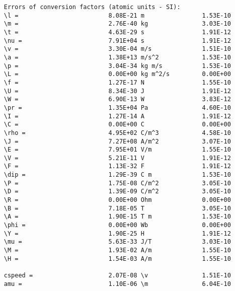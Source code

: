 \documentclass[12pt,a4paper]{article}
\begin{document}
\begin{verbatim}
     Errors of conversion factors (atomic units - SI):
     \l =                         8.08E-21 m                1.53E-10
     \m =                         2.76E-40 kg               3.03E-10
     \t =                         4.63E-29 s                1.91E-12
     \nu =                        7.91E+04 s                1.91E-12
     \v =                         3.30E-04 m/s              1.51E-10
     \a =                         1.38E+13 m/s^2            1.53E-10
     \p =                         3.04E-34 kg m/s           1.53E-10
     \L =                         0.00E+00 kg m^2/s         0.00E+00
     \f =                         1.27E-17 N                1.55E-10
     \U =                         8.34E-30 J                1.91E-12
     \W =                         6.90E-13 W                3.83E-12
     \pr =                        1.35E+04 Pa               4.60E-10
     \I =                         1.27E-14 A                1.91E-12
     \C =                         0.00E+00 C                0.00E+00
     \rho =                       4.95E+02 C/m^3            4.58E-10
     \J =                         7.27E+08 A/m^2            3.07E-10
     \E =                         7.95E+01 V/m              1.55E-10
     \V =                         5.21E-11 V                1.91E-12
     \F =                         1.13E-32 F                1.91E-12
     \dip =                       1.29E-39 C m              1.53E-10
     \P =                         1.75E-08 C/m^2            3.05E-10
     \D =                         1.39E-09 C/m^2            3.05E-10
     \R =                         0.00E+00 Ohm              0.00E+00
     \B =                         7.18E-05 T                3.05E-10
     \A =                         1.90E-15 T m              1.53E-10
     \phi =                       0.00E+00 Wb               0.00E+00
     \Y =                         1.90E-25 H                1.91E-12
     \mu =                        5.63E-33 J/T              3.03E-10
     \M =                         1.93E-02 A/m              1.55E-10
     \H =                         1.54E-03 A/m              1.55E-10

     cspeed =                     2.07E-08 \v               1.51E-10
     amu =                        1.10E-06 \m               6.04E-10



\end{verbatim}
\end{document}
